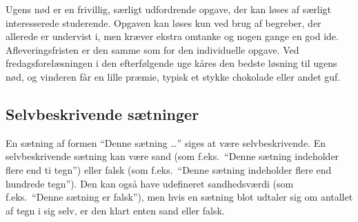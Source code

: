 \documentclass[a4paper,12pt]{article}
\begin{document}
Ugens nød er en frivillig, særligt udfordrende opgave, der kan løses
af særligt interesserede studerende.  Opgaven kan løses kun ved brug
af begreber, der allerede er undervist i, men kræver ekstra omtanke og
nogen gange en god ide.  Afleveringsfristen er den samme som for den
individuelle opgave.  Ved fredagsforelæsningen i den efterfølgende uge
kåres den bedste løsning til ugens nød, og vinderen får en lille
præmie, typisk et stykke chokolade eller andet guf.

\subsection*{Selvbeskrivende sætninger}

En sætning af formen ``Denne sætning \ldots'' siges at være
selvbeskrivende.  En selvbeskrivende sætning kan være sand (som
f.eks.\ ``Denne sætning indeholder flere end ti tegn'') eller falsk
(som f.eks.\ ``Denne sætning indeholder flere end hundrede tegn'').
Den kan også have udefineret sandhedsværdi (som f.eks.\ ``Denne
sætning er falsk''), men hvis en sætning blot udtaler sig om antallet
af tegn i sig selv, er den klart enten sand eller falsk.
\end{document}

